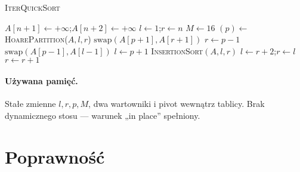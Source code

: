 \documentclass[11pt,a4paper]{article}
\begin{document}
\begin{algorithm}[H]
\caption{\textsc{IterQuickSort}}
\begin{algorithmic}[1]
\State $A[n+1]\gets +\infty$;\;$A[n+2]\gets +\infty$
\State $l\gets1$;\;$r\gets n$                     
\State $M\gets16$                                 
                                 
      \State $(p)\gets$\textsc{HoarePartition}($A,l,r$)  
                                    
         \State $\text{swap}(A[p+1],A[r+1])$      
         \State $r\gets p-1$                      
      \Else                                       {}
         \State $\text{swap}(A[p-1],A[l-1])$
         \State $l\gets p+1$
      \EndIf
   \EndWhile
   \State \textsc{InsertionSort}$(A,l,r)$          
   \State                                          %
         $l\gets r+2$;\;$r\gets l$                 
                           
         \State $r\gets r+1$
   \EndWhile
\EndWhile
\end{algorithmic}
\end{algorithm}

\paragraph{Używana pamięć.}
Stałe zmienne $l,r,p,M$,
dwa wartowniki i pivot wewnątrz tablicy.
Brak dynamicznego stosu — warunek „in place” spełniony.

\section*{Poprawność}
\end{document}
